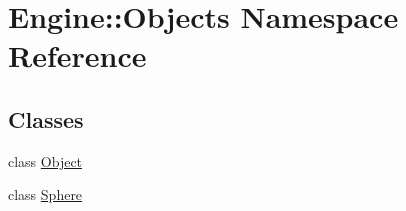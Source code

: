 \hypertarget{namespaceEngine_1_1Objects}{}\section{Engine\+:\+:Objects Namespace Reference}
\label{namespaceEngine_1_1Objects}
\subsection*{Classes}
\begin{DoxyCompactItemize}
\item 
class \mbox{\hyperlink{classEngine_1_1Objects_1_1Object}{Object}}
\item 
class \mbox{\hyperlink{classEngine_1_1Objects_1_1Sphere}{Sphere}}
\end{DoxyCompactItemize}
